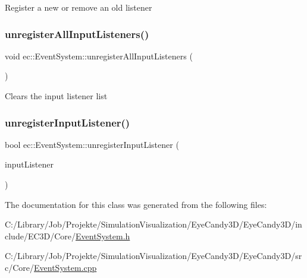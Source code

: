 Register a new or remove an old listener \mbox{\label{classec_1_1_event_system_a142264d74594a6584fd06a00eec45345}} 
\subsubsection{\texorpdfstring{unregister\+All\+Input\+Listeners()}{unregisterAllInputListeners()}}
{\footnotesize\ttfamily void ec\+::\+Event\+System\+::unregister\+All\+Input\+Listeners (\begin{DoxyParamCaption}{ }\end{DoxyParamCaption})}

Clears the input listener list \mbox{\label{classec_1_1_event_system_a6b76350de7e412e8df412b8c5bfd5b03}} 
\subsubsection{\texorpdfstring{unregister\+Input\+Listener()}{unregisterInputListener()}}
{\footnotesize\ttfamily bool ec\+::\+Event\+System\+::unregister\+Input\+Listener (\begin{DoxyParamCaption}\item[{\mbox{\hyperlink{classec_1_1_input_listener}{Input\+Listener}} $\ast$}]{input\+Listener }\end{DoxyParamCaption})}



The documentation for this class was generated from the following files\+:\begin{DoxyCompactItemize}
\item 
C\+:/\+Library/\+Job/\+Projekte/\+Simulation\+Visualization/\+Eye\+Candy3\+D/\+Eye\+Candy3\+D/include/\+E\+C3\+D/\+Core/\mbox{\hyperlink{_event_system_8h}{Event\+System.\+h}}\item 
C\+:/\+Library/\+Job/\+Projekte/\+Simulation\+Visualization/\+Eye\+Candy3\+D/\+Eye\+Candy3\+D/src/\+Core/\mbox{\hyperlink{_event_system_8cpp}{Event\+System.\+cpp}}\end{DoxyCompactItemize}
